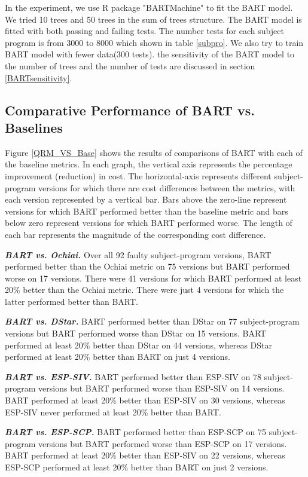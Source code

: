 In the experiment, we use R package "BARTMachine" \cite{BARTMachine} to fit the BART model. We tried 10 trees and 50 trees in the sum of trees structure.  The BART model is fitted with both passing and failing tests. The number tests for each subject program is from 3000 to 8000 which shown in table \ref{subpro}. We also try to train BART model with fewer data(300 tests). the sensitivity of the BART model to the number of trees and the number of tests are discussed in section \ref{BARTsensitivity}.

\subsection{Comparative Performance of BART vs. Baselines}

Figure \ref{QRM_VS_Base} shows the results of comparisons of BART with each of the baseline metrics.  In each graph, the vertical axis represents the percentage improvement (reduction) in cost. The horizontal-axis represents different subject-program versions for which there are cost differences between the metrics, with each version represented by a vertical bar.   Bars above the zero-line represent versions for which BART performed better than the baseline metric and bars below zero represent versions for which BART performed worse.  The length of each bar represents the magnitude of the corresponding cost difference.

\textit{\textbf{ BART vs. Ochiai.}}  Over all 92 faulty subject-program versions, BART performed better than the Ochiai metric on 75 versions but BART performed worse on 17 versions.  There were 41 versions for which BART performed at least 20\% better than the Ochiai metric.  There were just 4 versions for which the latter performed better than BART.

\textit{\textbf{ BART vs. DStar.}}  BART performed better than DStar on 77 subject-program versions but BART performed worse than DStar on 15 versions.  BART performed at least 20\% better than DStar on 44 versions, whereas DStar performed at least 20\% better than BART on just 4 versions.

\textit{\textbf{ BART vs. ESP-SIV.}} BART performed better than ESP-SIV on 78 subject-program versions but BART performed worse than ESP-SIV on 14 versions.  BART performed at least 20\% better than ESP-SIV on 30 versions, whereas ESP-SIV never performed at least 20\% better than BART.

\textit{\textbf{ BART vs. ESP-SCP.}}  BART performed better than ESP-SCP on 75 subject-program versions but BART performed worse than ESP-SCP on 17 versions.  BART performed at least 20\% better than ESP-SIV on 22 versions, whereas ESP-SCP performed at least 20\% better than BART on just 2 versions.

